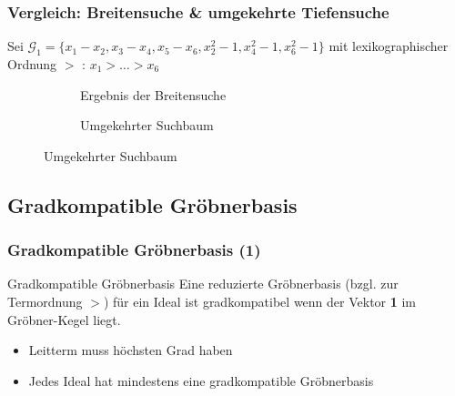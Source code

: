 \documentclass{beamer}
\begin{document}

\begin{frame}[<+->]
\frametitle{Vergleich: Breitensuche \& umgekehrte Tiefensuche}

Sei $ \mathcal{G}_{1} = \{x_{1} - x_{2}, x_{3} - x_{4}, x_{5}-x_{6} , x_{2}^{2} -1 , x_{4}^{2} - 1, x_{6}^{2} - 1 \} $ mit lexikographischer Ordnung $>$ : $x_{1} > \ldots > x_{6} $


\begin{figure}[h]
    \centering
    \begin{subfigure}[b]{0.48\linewidth}        %
        \centering
        
        \caption{Ergebnis der Breitensuche}
        \label{fig:breadth}
    \end{subfigure}
    \begin{subfigure}[b]{0.48\linewidth}        %
        \centering
        
        \caption{Umgekehrter Suchbaum}
        \label{fig:reverse}
    \end{subfigure}
    \label{fig:graph}
\end{figure}

\end{frame}

\subsection{Gradkompatible Gröbnerbasis}
\begin{frame}[<+->]
\frametitle{Gradkompatible Gröbnerbasis (1)}

\begin{block}{Gradkompatible Gröbnerbasis}
Eine reduzierte Gröbnerbasis (bzgl. zur Termordnung $>$) für ein Ideal ist gradkompatibel wenn der Vektor \textbf{1} im Gröbner-Kegel liegt.

\end{block}

\begin{itemize}
\item Leitterm muss höchsten Grad haben
\item Jedes Ideal hat mindestens eine gradkompatible Gröbnerbasis
\end{itemize}




\end{frame}
\end{document}
